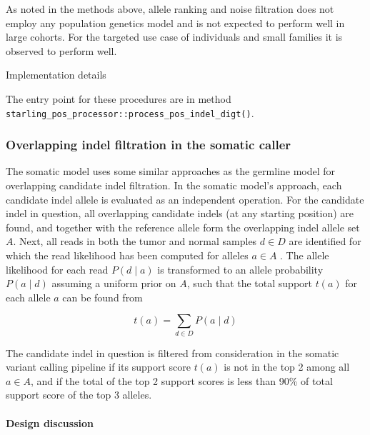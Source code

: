 \documentclass{article}
\let\IncludeDevelopmentDetail
\newenvironment{raggedParagraph}[1]
{
    \begin{paragraph} {#1}
        \raggedright
    }
    {
    \end{paragraph}
}
\begin{document}
As noted in the methods above, allele ranking and noise filtration does not employ any population genetics model and is not expected to perform well in large cohorts. For the targeted use case of individuals and small families it is observed to perform well.

\begin{raggedParagraph}{Implementation details}

    The entry point for these procedures are in method \verb|starling_pos_processor::process_pos_indel_digt()|.

\end{raggedParagraph}

\fi %


\subsubsection{Overlapping indel filtration in the somatic caller}

The somatic model uses some similar approaches as the germline model for overlapping candidate indel filtration. In the somatic model's approach, each candidate indel allele is evaluated as an independent operation. For the candidate indel in question, all overlapping candidate indels (at any starting position) are found, and together with the reference allele form the overlapping indel allele set $A$. Next, all reads in both the tumor and normal samples $d \in D$ are identified for which the read likelihood has been computed for alleles $a \in A$ . The allele likelihood for each read $P(d \mid a)$ is transformed to an allele probability $P(a \mid d)$ assuming a uniform prior on $A$, such that the total support $t(a)$ for each allele $a$ can be found from

\begin{equation*}
\label{eq:perSomaticModelAlleleSupport}
t(a) = \sum_{d \in D}{P(a \mid d)}
\end{equation*}

The candidate indel in question is filtered from consideration in the somatic variant calling pipeline if its support score $t(a)$ is not in the top 2 among all $a \in A$, and if the total of the top 2 support scores is less than 90\% of total support score of the top 3 alleles.

\ifx\IncludeDevelopmentDetail

\paragraph{Design discussion}
\end{document}
